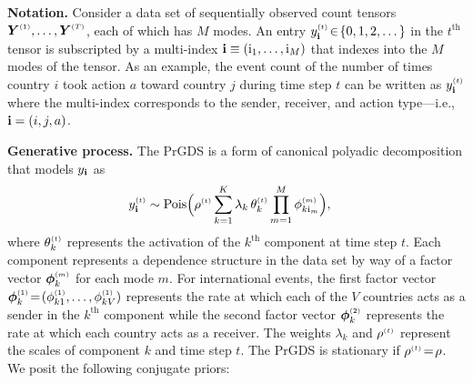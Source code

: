 \documentclass{article}
\begin{document}
\textbf{Notation.} Consider a data set of sequentially observed count tensors $\boldsymbol{Y}^{\mathsmaller{(1)}},\dots,\boldsymbol{Y}^{\mathsmaller{(T)}}$, each of which has $M$ modes. An entry $\ydt \!\in\! \{0,1,2,\dots\}$ in the $t^{\textrm{th}}$ tensor is subscripted by a multi-index $\textbf{\textrm{i}} \equiv (\textrm{i}_1,\dots,\textrm{i}_M)$ that indexes into the $M$ modes of the tensor. As an example, the event count of the number of times country $i$ took action $a$ toward country $j$ during time step $t$ can be written as $\ydt$  where the multi-index corresponds to the sender, receiver, and action type---i.e., $\textbf{\textrm{i}} = (i, j, a)$.~

\textbf{Generative process.} The PrGDS is a form of canonical polyadic decomposition \cite{harshman1970foundations} that models $y_{\textbf{\textrm{i}}}$ as~
\begin{align}
\label{eq:tensor_likelihood}
\ydt &\sim \textrm{Pois}\Big(\rhot \sum_{k = 1}^K \lambda_k \, \thetakt \prod_{m=1}^M \phi^{\mathsmaller{(m)}}_{k \osub_m}\Big),
\end{align}
where $\thetakt$ represents the activation of the $k^{\textrm{th}}$ component at time step $t$. Each component represents a dependence structure in the data set by way of a factor vector $\boldsymbol{\phi}^{\mathsmaller{(m)}}_{k}$ for each mode $m$. For international events, the first factor vector $\boldsymbol{\phi}^{\mathsmaller{(1)}}_{k} \teq (\phi^{\mathsmaller{(1)}}_{k1},\dots,\phi^{\mathsmaller{(1)}}_{kV})$ represents the rate at which each of the $V$ countries acts as a sender in the $k^{\textrm{th}}$ component while the second factor vector $\boldsymbol{\phi}^{\mathsmaller{(2)}}_{k}$ represents the rate at which each country acts as a receiver. The weights $\lambda_k$ and $\rho^{\mathsmaller{(t)}}$ represent the scales of component $k$ and time step $t$. The PrGDS is stationary if $\rhot \teq \rho$. We posit the following conjugate priors:~
\end{document}
